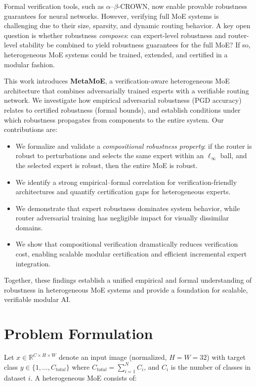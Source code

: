 \documentclass[11pt,a4paper]{article}
\begin{document}
Formal verification tools, such as $\alpha$--$\beta$-CROWN, now enable provable robustness guarantees for neural networks. However, verifying full MoE systems is challenging due to their size, sparsity, and dynamic routing behavior. A key open question is whether robustness \emph{composes}: can expert-level robustness and router-level stability be combined to yield robustness guarantees for the full MoE? If so, heterogeneous MoE systems could be trained, extended, and certified in a modular fashion.

This work introduces \textbf{MetaMoE}, a verification-aware heterogeneous MoE architecture that combines adversarially trained experts with a verifiable routing network. We investigate how empirical adversarial robustness (PGD accuracy) relates to certified robustness (formal bounds), and establish conditions under which robustness propagates from components to the entire system. Our contributions are:

\begin{itemize}
    \item We formalize and validate a \emph{compositional robustness property}: if the router is robust to perturbations and selects the same expert within an $\ell_\infty$ ball, and the selected expert is robust, then the entire MoE is robust.
    \item We identify a strong empirical--formal correlation for verification-friendly architectures and quantify certification gaps for heterogeneous experts.
    \item We demonstrate that expert robustness dominates system behavior, while router adversarial training has negligible impact for visually dissimilar domains.
    \item We show that compositional verification dramatically reduces verification cost, enabling scalable modular certification and efficient incremental expert integration.
\end{itemize}

Together, these findings establish a unified empirical and formal understanding of robustness in heterogeneous MoE systems and provide a foundation for scalable, verifiable modular AI.

\section{Problem Formulation}

Let $x \in \mathbb{R}^{C \times H \times W}$ denote an input image (normalized, $H = W = 32$) with target class $y \in \{1, \ldots, C_{total}\}$ where $C_{total} = \sum_{i=1}^{N} C_i$, and $C_i$ is the number of classes in dataset $i$. A heterogeneous MoE consists of:
\end{document}
